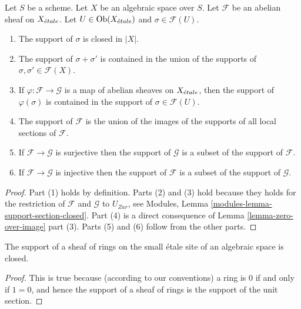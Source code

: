 \begin{lemma}
\label{lemma-support-section-closed}
Let $S$ be a scheme.
Let $X$ be an algebraic space over $S$.
Let $\mathcal{F}$ be an abelian sheaf on $X_{\acute{e}tale}$.
Let $U \in \mathop{\mathrm{Ob}}\nolimits(X_{\acute{e}tale})$ and $\sigma \in \mathcal{F}(U)$.
\begin{enumerate}
\item The support of $\sigma$ is closed in $|X|$.
\item The support of $\sigma + \sigma'$ is contained in the union of
the supports of $\sigma, \sigma' \in \mathcal{F}(X)$.
\item If $\varphi : \mathcal{F} \to \mathcal{G}$ is a map of
abelian sheaves on $X_{\acute{e}tale}$, then the support of $\varphi(\sigma)$ is
contained in the support of $\sigma \in \mathcal{F}(U)$.
\item The support of $\mathcal{F}$ is the union of the images of the
supports of all local sections of $\mathcal{F}$.
\item If $\mathcal{F} \to \mathcal{G}$ is surjective then the support
of $\mathcal{G}$ is a subset of the support of $\mathcal{F}$.
\item If $\mathcal{F} \to \mathcal{G}$ is injective then the support
of $\mathcal{F}$ is a subset of the support of $\mathcal{G}$.
\end{enumerate}
\end{lemma}

\begin{proof}
Part (1) holds by definition.
Parts (2) and (3) hold because they holds for the restriction of
$\mathcal{F}$ and $\mathcal{G}$ to $U_{Zar}$, see
Modules, Lemma \ref{modules-lemma-support-section-closed}.
Part (4) is a direct consequence of
Lemma \ref{lemma-zero-over-image} part (3).
Parts (5) and (6) follow from the other parts.
\end{proof}

\begin{lemma}
\label{lemma-support-sheaf-rings-closed}
The support of a sheaf of rings on the small \'etale site of an
algebraic space is closed.
\end{lemma}

\begin{proof}
This is true because (according to our conventions)
a ring is $0$ if and only if
$1 = 0$, and hence the support of a sheaf of rings
is the support of the unit section.
\end{proof}






